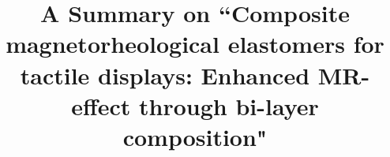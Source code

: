 \documentclass[conference]{IEEEtran}
\begin{document}
\title{A Summary on ``Composite magnetorheological elastomers for tactile displays: Enhanced
	MR-effect through bi-layer composition"\\
}
\author{
	}


\maketitle
\end{document}
